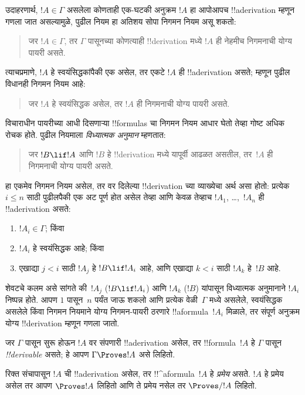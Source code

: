 \documentclass[../../../include/open-logic-section]{subfiles}
\begin{document}
उदाहरणार्थ, $!A \in \Gamma$ असलेला कोणताही एक-घटकी अनुक्रम $!A$ हा
आपोआपच !!a{derivation} म्हणून गणला जात असल्यामुळे, पुढील नियम हा
अतिशय सोपा निगमन नियम असू शकतो:
\begin{quote}
  जर $!A \in \Gamma$, तर $\Gamma$ पासूनच्या कोणत्याही !!{derivation}
  मध्ये $!A$ ही नेहमीच निगमनाची योग्य पायरी असते.
\end{quote}
त्याचप्रमाणे, $!A$ हे स्वयंसिद्धकांपैकी एक असेल, तर एकटे $!A$ ही
!!a{derivation} असते; म्हणून पुढील विधानही निगमन नियम आहे:
\begin{quote}
  जर $!A$ हे स्वयंसिद्धक असेल, तर $!A$ ही निगमनाची योग्य पायरी असते.
\end{quote}
विचाराधीन पायरीच्या आधी दिसणाऱ्या !!{formula}s चा निगमन नियम आधार घेतो
तेव्हा गोष्ट अधिक रोचक होते. पुढील नियमाला \emph{विध्यात्मक अनुमान}
म्हणतात:
\begin{quote}
  जर $!B \lif !A$ आणि $!B$ हे !!{derivation} मध्ये यापूर्वी आढळत असतील,
  तर~$!A$ ही निगमनाची योग्य पायरी असते.
\end{quote}
हा एकमेव निगमन नियम असेल, तर वर दिलेल्या !!{derivation} च्या व्याख्येचा
अर्थ असा होतो: प्रत्येक $i \le n$ साठी पुढीलपैकी एक अट पूर्ण होत असेल
तेव्हा आणि केवळ तेव्हाच $!A_1$, \dots,~$!A_n$ ही !!a{derivation} असते:
\begin{enumerate}
\item $!A_i \in \Gamma$; किंवा
\item $!A_i$ हे स्वयंसिद्धक आहे; किंवा
\item एखाद्या $j < i$ साठी $!A_j$ हे $!B \lif !A_i$ आहे, आणि एखाद्या
  $k < i$ साठी $!A_k$ हे~$!B$ आहे.
\end{enumerate}
शेवटचे कलम असे सांगते की~$!A_j$ ($!B \lif !A_i$) आणि $!A_k$ ($!B$)
यांपासून विध्यात्मक अनुमानाने $!A_i$ निष्पन्न होते. आपण $1$ पासून~$n$
पर्यंत जाऊ शकलो आणि प्रत्येक वेळी~$\Gamma$ मध्ये असलेले, स्वयंसिद्धक
असलेले किंवा निगमन नियमाने योग्य निगमन-पायरी ठरणारे !!a{formula}~$!A_i$
मिळाले, तर संपूर्ण अनुक्रम योग्य !!{derivation} म्हणून गणला जातो.

\begin{defn}[!!^{derivability}]
जर $\Gamma$ पासून सुरू होऊन $!A$ वर संपणारी !!a{derivation} असेल, तर
!!{formula}~$!A$ हे $\Gamma$ पासून \emph{!!{derivable}} असते; हे आपण
$\Gamma \Proves !A$ असे लिहितो.
\end{defn}

\begin{defn}[प्रमेये]
रिक्त संचापासून $!A$ ची !!a{derivation} असेल, तर !!^a{formula}~$!A$ हे
\emph{प्रमेय} असते. $!A$ हे प्रमेय असेल तर आपण $\Proves !A$ लिहितो आणि
ते प्रमेय नसेल तर $\Proves/ !A$ लिहितो.
\end{defn}
\end{document}
